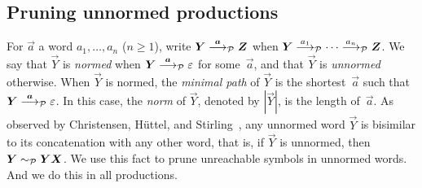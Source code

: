 \subsection{Pruning unnormed productions}

For $\vec a$ a word $a_1,\dots, a_n$ ($n\ge1$), write
$\vec Y \LTSderivesP[\vec a] \vec Z$ when
$\vec Y \LTSderivesP[a_1] \cdots \LTSderivesP[a_n] \vec Z$.
%
We say that $\vec Y$ is \emph{normed} when
$\vec Y \LTSderivesP[\vec a] \varepsilon$ for some~$\vec a$, and that
$\vec Y$ is \emph{unnormed} otherwise.
%
When $\vec Y$ is normed, the \emph{minimal path} of $\vec Y$ is the
shortest~$\vec a$ such that $\vec Y \LTSderivesP[\vec a]
\varepsilon$.
%
In this case, the \emph{norm} of $\vec Y$, denoted by $|\vec Y|$, is
the length of~$\vec a$.
%
%
As observed by Christensen, H\"uttel, and
Stirling~\cite{DBLP:journals/iandc/ChristensenHS95}, any unnormed word
$\vec Y$ is bisimilar to its concatenation with any other word, that
is, if $\vec Y$ is unnormed, then $\vec Y \ProdEquiv \vec Y \vec X$.
We use this fact to prune unreachable symbols in unnormed words. And
we do this in all productions.





